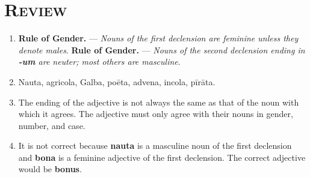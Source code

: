 \documentclass[12pt]{article}
\begin{document}
\section{\textsc{Review}}
\begin{enumerate}[1.]
	\item \textbf{Rule of Gender.} --- \textit{Nouns of the first declension are feminine unless they denote males}. \textbf{Rule of Gender.} --- \textit{Nouns of the second declension ending in \textbf{-um} are neuter; most others are masculine}.
	\item Nauta, agricola, Galba, poēta, advena, incola, pīrāta.
	\item The ending of the adjective is not always the same as that of the noun with which it agrees. The adjective must only agree with their nouns in gender, number, and case.
	\item It is not correct because \textbf{nauta} is a masculine noun of the first declension and \textbf{bona} is a feminine adjective of the first declension. The correct adjective would be \textbf{bonus}.
\end{enumerate}
\end{document}
